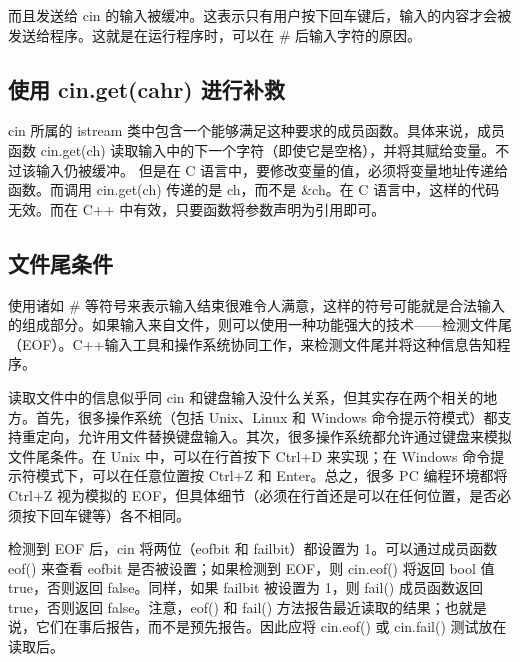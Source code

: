 而且发送给 cin 的输入被缓冲。这表示只有用户按下回车键后，输入的内容才会被发送给程序。这就是在运行程序时，可以在 \# 后输入字符的原因。
\subsection{使用 cin.get(cahr) 进行补救}
cin 所属的 istream 类中包含一个能够满足这种要求的成员函数。具体来说，成员函数 cin.get(ch) 读取输入中的下一个字符（即使它是空格），并将其赋给变量。不过该输入仍被缓冲。
但是在 C 语言中，要修改变量的值，必须将变量{\color{red}地址}传递给函数。而调用 cin.get(ch) 传递的是 ch，而不是 \&ch。在 C 语言中，这样的代码无效。而在 C++ 中有效，只要函数将参数声明为引用即可。
\subsection{文件尾条件}
使用诸如 \# 等符号来表示输入结束很难令人满意，这样的符号可能就是合法输入的组成部分。如果输入来自文件，则可以使用一种功能强大的技术——检测文件尾（EOF）。C++输入工具和操作系统协同工作，来检测文件尾并将这种信息告知程序。

读取文件中的信息似乎同 cin 和键盘输入没什么关系，但其实存在两个相关的地方。首先，很多操作系统（包括 Unix、Linux 和 Windows 命令提示符模式）都支持重定向，允许用文件替换键盘输入。其次，很多操作系统都允许通过键盘来模拟文件尾条件。在 Unix 中，可以在行首按下 Ctrl+D 来实现；在 Windows 命令提示符模式下，可以在任意位置按 Ctrl+Z 和 Enter。总之，很多 PC 编程环境都将 Ctrl+Z 视为模拟的 EOF，但具体细节（必须在行首还是可以在任何位置，是否必须按下回车键等）各不相同。

检测到 EOF 后，cin 将两位（eofbit 和 failbit）都设置为 1。可以通过成员函数 eof() 来查看 eofbit 是否被设置；如果检测到 EOF，则 cin.eof() 将返回 bool 值 true，否则返回 false。同样，如果 failbit 被设置为 1，则 fail() 成员函数返回 true，否则返回 false。注意，eof() 和 fail() 方法报告最近读取的结果；也就是说，它们在事后报告，而不是预先报告。因此应将 cin.eof() 或 cin.fail() 测试放在读取后。